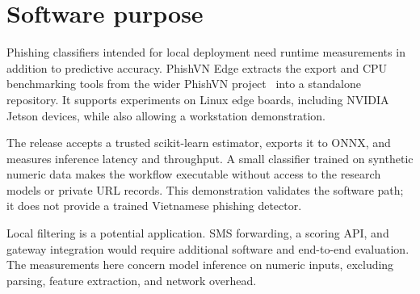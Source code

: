 \section{Software purpose}
Phishing classifiers intended for local deployment need runtime measurements in addition to predictive accuracy. PhishVN Edge extracts the export and CPU benchmarking tools from the wider PhishVN project~\cite{phishvn_p1} into a standalone repository. It supports experiments on Linux edge boards, including NVIDIA Jetson devices, while also allowing a workstation demonstration.

The release accepts a trusted scikit-learn estimator, exports it to ONNX, and measures inference latency and throughput. A small classifier trained on synthetic numeric data makes the workflow executable without access to the research models or private URL records. This demonstration validates the software path; it does not provide a trained Vietnamese phishing detector.

Local filtering is a potential application. SMS forwarding, a scoring API, and gateway integration would require additional software and end-to-end evaluation. The measurements here concern model inference on numeric inputs, excluding parsing, feature extraction, and network overhead.
